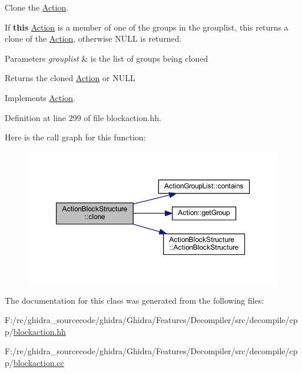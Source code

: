 Clone the \mbox{\hyperlink{class_action}{Action}}. 

If {\bfseries{this}} \mbox{\hyperlink{class_action}{Action}} is a member of one of the groups in the grouplist, this returns a clone of the \mbox{\hyperlink{class_action}{Action}}, otherwise N\+U\+LL is returned. 
\begin{DoxyParams}{Parameters}
{\em grouplist} & is the list of groups being cloned \\
\hline
\end{DoxyParams}
\begin{DoxyReturn}{Returns}
the cloned \mbox{\hyperlink{class_action}{Action}} or N\+U\+LL 
\end{DoxyReturn}


Implements \mbox{\hyperlink{class_action_af8242e41d09e5df52f97df9e65cc626f}{Action}}.



Definition at line 299 of file blockaction.\+hh.

Here is the call graph for this function\+:
\nopagebreak
\begin{figure}[H]
\begin{center}
\leavevmode
\includegraphics[width=350pt]{class_action_block_structure_ab86eb695c4acc6d3e69cbbc844445fdc_cgraph}
\end{center}
\end{figure}


The documentation for this class was generated from the following files\+:\begin{DoxyCompactItemize}
\item 
F\+:/re/ghidra\+\_\+sourcecode/ghidra/\+Ghidra/\+Features/\+Decompiler/src/decompile/cpp/\mbox{\hyperlink{blockaction_8hh}{blockaction.\+hh}}\item 
F\+:/re/ghidra\+\_\+sourcecode/ghidra/\+Ghidra/\+Features/\+Decompiler/src/decompile/cpp/\mbox{\hyperlink{blockaction_8cc}{blockaction.\+cc}}\end{DoxyCompactItemize}
